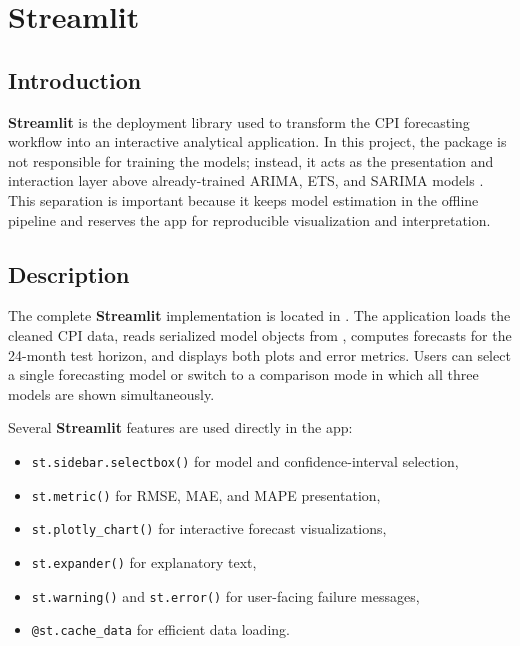 %
%
%

\chapter{Streamlit}
\label{ch:streamlit}

\section{Introduction}

\textbf{Streamlit} is the deployment library used to transform the CPI forecasting workflow into an interactive analytical application. In this project, the package is not responsible for training the models; instead, it acts as the presentation and interaction layer above already-trained ARIMA, ETS, and SARIMA models \cite{streamlit-doc}. This separation is important because it keeps model estimation in the offline pipeline and reserves the app for reproducible visualization and interpretation.

\section{Description}

The complete \textbf{Streamlit} implementation is located in . The application loads the cleaned CPI data, reads serialized model objects from , computes forecasts for the 24-month test horizon, and displays both plots and error metrics. Users can select a single forecasting model or switch to a comparison mode in which all three models are shown simultaneously.

Several \textbf{Streamlit} features are used directly in the app:

\begin{itemize}
    \item \texttt{st.sidebar.selectbox()} for model and confidence-interval selection,
    \item \texttt{st.metric()} for RMSE, MAE, and MAPE presentation,
    \item \texttt{st.plotly\_chart()} for interactive forecast visualizations,
    \item \texttt{st.expander()} for explanatory text,
    \item \texttt{st.warning()} and \texttt{st.error()} for user-facing failure messages,
    \item \texttt{@st.cache\_data} for efficient data loading.
\end{itemize}


